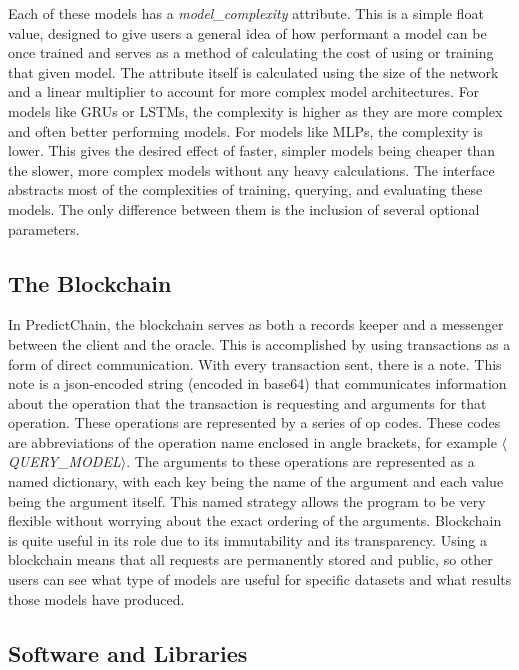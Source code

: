 \documentclass{article}
\begin{document}
    Each of these models has a \textit{model\_complexity} attribute.  This is a simple float value, designed to give users
    a general idea of how performant a model can be once trained and serves as a method of calculating the cost of using
    or training that given model.  The attribute itself is calculated using the size of the network and a linear multiplier to
    account for more complex model architectures.  For models like GRUs or LSTMs, the complexity is higher as they are more complex and often
    better performing models.  For models like MLPs, the complexity is lower.  This gives the desired effect of faster, simpler
    models being cheaper than the slower, more complex models without any heavy calculations.   The interface abstracts most
    of the complexities of training, querying, and evaluating these models.  The only difference between them is the inclusion
    of several optional parameters.

    \subsection{The Blockchain}

    In PredictChain, the blockchain serves as both a records keeper and a messenger between the client and the oracle.
    This is accomplished by using transactions as a form of direct communication.  With every transaction sent, there is a note.
    This note is a json-encoded string (encoded in base64) that communicates information about the operation that the transaction
    is requesting and arguments for that operation.  These operations are represented by a series
    of op codes.  These codes are abbreviations of the operation name enclosed in angle brackets, for example $\langle$\textit{QUERY\_MODEL}$\rangle$.
    The arguments to these operations are represented as a named dictionary, with each key being the name of the argument and each
    value being the argument itself.  This named strategy allows the program to be very flexible without worrying about the exact
    ordering of the arguments.  Blockchain is quite useful in its role due to its immutability and its transparency.  Using
    a blockchain means that all requests are permanently stored and public, so other users can see what type of models are useful
    for specific datasets and what results those models have produced.

    \subsection{Software and Libraries}
    
\end{document}
